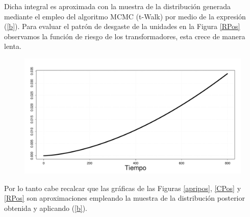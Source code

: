 \noindent Dicha integral es aproximada con la muestra de la distribuci\'on generada mediante el empleo del algoritmo MCMC (t-Walk) por medio de la expresi\'on (\ref{b}). 
\noindent Para evaluar el patr\'on de desgaste de la unidades en la Figura \ref{RPos} observamos la funci\'on de riesgo de los transformadores, esta crece de manera lenta.
\begin{figure}[h!]
\begin{center}
\includegraphics[scale=.25]{Rpos.pdf}
\end{center}
\end{figure}
\noindent Por lo tanto cabe recalcar que las gr\'aficas de las Figuras \ref{apripos}, \ref{CPos} y \ref{RPos} son aproximaciones empleando la muestra de la distribuci\'on posterior obtenida y aplicando (\ref{b}).



%
\newpage \thispagestyle{empty} \cleardoublepage